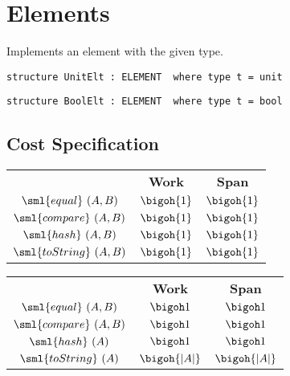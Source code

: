 \chapter{Elements}
\label{ch:elt-structures}

\begin{cluster}
\label{grp:prmbl:elt-structures::implements}

\begin{preamble}
\label{prmbl:elt-structures::implements}
Implements an element with the given type.

\begin{verbatim}
structure UnitElt : ELEMENT  where type t = unit
\end{verbatim}

\begin{verbatim}
structure BoolElt : ELEMENT  where type t = bool
\end{verbatim}

\end{preamble}
\end{cluster}


\section{Cost Specification}
\label{sec:elt-structures::cost-specification}

\begin{cluster}
\label{grp:cost:unit}

\begin{costspec}[UnitElt]
\label{cost:unit}
\begin{tabular}{c|c|c}
& \textbf{Work} & \textbf{Span} \\
$\sml{equal}~(A,B)$ & $\bigoh {1}$ & $\bigoh {1}$ \\
$\sml{compare}~(A,B)$ & $\bigoh {1}$ & $\bigoh {1}$ \\
$\sml{hash}~(A,B)$ & $\bigoh {1}$ & $\bigoh {1}$ \\
$\sml{toString}~(A,B)$ & $\bigoh {1}$ & $\bigoh {1}$ \\
\end{tabular}

\end{costspec}
\end{cluster}

\begin{cluster}
\label{grp:cst:elt-structures::intelt}

\begin{costspec}[IntElt]
\label{cst:elt-structures::intelt}
\begin{tabular}{c|c|c}
& \textbf{Work} & \textbf{Span} \\
$\sml{equal}~(A,B)$ & $\bigoh 1$ & $\bigoh 1$ \\
$\sml{compare}~(A,B)$ & $\bigoh 1$ & $\bigoh 1$ \\
$\sml{hash}~(A)$ & $\bigoh 1$ & $\bigoh 1$ \\
$\sml{toString}~(A)$ & $\bigoh{|A|}$ & $\bigoh{|A|}$ \\
\end{tabular}

\end{costspec}
\end{cluster}

